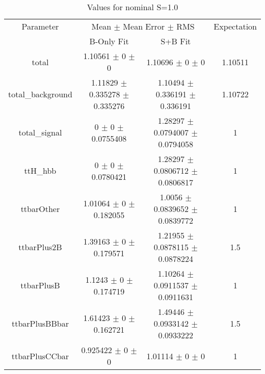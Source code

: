 \begin{table}
\centering
\caption{Values for nominal S=1.0}
\begin{tabular}{cccc}
\toprule
Parameter & \multicolumn{2}{c}{Mean $\pm$ Mean Error $\pm$ RMS} & Expectation\\
 & B-Only Fit & S+B Fit & \\
\midrule
total & \num{1.10561} $\pm$ \num{0} $\pm$ \num{0} & \num{1.10696} $\pm$ \num{0} $\pm$ \num{0} & \num{1.10511}\\
total\_background & \num{1.11829} $\pm$ \num{0.335278} $\pm$ \num{0.335276} & \num{1.10494} $\pm$ \num{0.336191} $\pm$ \num{0.336191} & \num{1.10722}\\
total\_signal & \num{0} $\pm$ \num{0} $\pm$ \num{0.0755408} & \num{1.28297} $\pm$ \num{0.0794007} $\pm$ \num{0.0794058} & \num{1}\\
ttH\_hbb & \num{0} $\pm$ \num{0} $\pm$ \num{0.0780421} & \num{1.28297} $\pm$ \num{0.0806712} $\pm$ \num{0.0806817} & \num{1}\\
ttbarOther & \num{1.01064} $\pm$ \num{0} $\pm$ \num{0.182055} & \num{1.0056} $\pm$ \num{0.0839652} $\pm$ \num{0.0839772} & \num{1}\\
ttbarPlus2B & \num{1.39163} $\pm$ \num{0} $\pm$ \num{0.179571} & \num{1.21955} $\pm$ \num{0.0878115} $\pm$ \num{0.0878224} & \num{1.5}\\
ttbarPlusB & \num{1.1243} $\pm$ \num{0} $\pm$ \num{0.174719} & \num{1.10264} $\pm$ \num{0.0911537} $\pm$ \num{0.0911631} & \num{1}\\
ttbarPlusBBbar & \num{1.61423} $\pm$ \num{0} $\pm$ \num{0.162721} & \num{1.49446} $\pm$ \num{0.0933142} $\pm$ \num{0.0933222} & \num{1.5}\\
ttbarPlusCCbar & \num{0.925422} $\pm$ \num{0} $\pm$ \num{0} & \num{1.01114} $\pm$ \num{0} $\pm$ \num{0} & \num{1}\\
\bottomrule
\end{tabular}
\end{table}